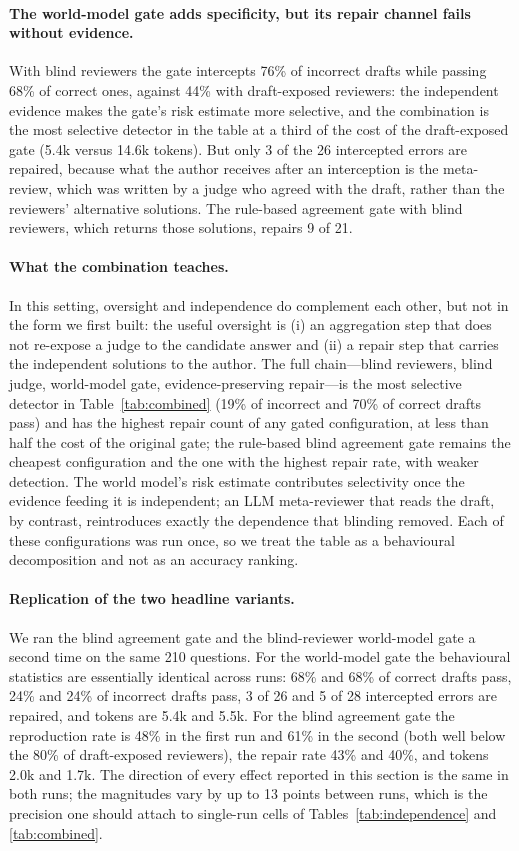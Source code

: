\paragraph{The world-model gate adds specificity, but its repair channel fails without evidence.}
With blind reviewers the gate intercepts 76\% of incorrect drafts while passing 68\% of correct ones, against 44\% with draft-exposed reviewers: the independent evidence makes the gate's risk estimate more selective, and the combination is the most selective detector in the table at a third of the cost of the draft-exposed gate (5.4k versus 14.6k tokens).
But only 3 of the 26 intercepted errors are repaired, because what the author receives after an interception is the meta-review, which was written by a judge who agreed with the draft, rather than the reviewers' alternative solutions.
The rule-based agreement gate with blind reviewers, which returns those solutions, repairs 9 of 21.

\paragraph{What the combination teaches.}
In this setting, oversight and independence do complement each other, but not in the form we first built: the useful oversight is (i) an aggregation step that does not re-expose a judge to the candidate answer and (ii) a repair step that carries the independent solutions to the author.
The full chain---blind reviewers, blind judge, world-model gate, evidence-preserving repair---is the most selective detector in Table~\ref{tab:combined} (19\% of incorrect and 70\% of correct drafts pass) and has the highest repair count of any gated configuration, at less than half the cost of the original gate; the rule-based blind agreement gate remains the cheapest configuration and the one with the highest repair rate, with weaker detection.
The world model's risk estimate contributes selectivity once the evidence feeding it is independent; an LLM meta-reviewer that reads the draft, by contrast, reintroduces exactly the dependence that blinding removed.
Each of these configurations was run once, so we treat the table as a behavioural decomposition and not as an accuracy ranking.

\paragraph{Replication of the two headline variants.}
We ran the blind agreement gate and the blind-reviewer world-model gate a second time on the same 210 questions.
For the world-model gate the behavioural statistics are essentially identical across runs: 68\% and 68\% of correct drafts pass, 24\% and 24\% of incorrect drafts pass, 3 of 26 and 5 of 28 intercepted errors are repaired, and tokens are 5.4k and 5.5k.
For the blind agreement gate the reproduction rate is 48\% in the first run and 61\% in the second (both well below the 80\% of draft-exposed reviewers), the repair rate 43\% and 40\%, and tokens 2.0k and 1.7k.
The direction of every effect reported in this section is the same in both runs; the magnitudes vary by up to 13 points between runs, which is the precision one should attach to single-run cells of Tables~\ref{tab:independence} and \ref{tab:combined}.
